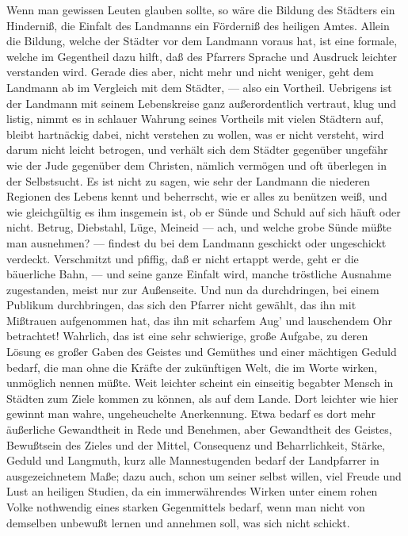 Wenn man gewissen Leuten glauben sollte, so wäre die Bildung des Städters ein Hinderniß, die Einfalt des Landmanns ein Förderniß des heiligen Amtes. Allein die Bildung, welche der Städter vor dem Landmann voraus hat, ist eine formale, welche im Gegentheil dazu hilft, daß des Pfarrers Sprache und Ausdruck leichter verstanden wird. Gerade dies aber, nicht mehr und nicht weniger, geht dem Landmann ab im Vergleich mit dem Städter, — also ein Vortheil. Uebrigens ist der Landmann mit seinem
Lebenskreise ganz außerordentlich vertraut, klug und listig, nimmt es in schlauer Wahrung seines Vortheils mit vielen Städtern auf, bleibt hartnäckig dabei, nicht verstehen zu wollen, was er nicht versteht, wird darum nicht leicht betrogen, und verhält sich dem Städter gegenüber ungefähr wie der Jude gegenüber dem Christen, nämlich vermögen und oft überlegen in der Selbstsucht. Es ist nicht zu sagen, wie sehr der Landmann die niederen Regionen des Lebens kennt und beherrscht, wie er alles zu benützen weiß, und wie gleichgültig es ihm insgemein ist, ob er Sünde und Schuld auf sich häuft oder nicht. Betrug, Diebstahl, Lüge, Meineid — ach, und welche grobe Sünde müßte man ausnehmen? — findest du bei dem Landmann geschickt oder ungeschickt verdeckt. Verschmitzt und pfiffig, daß er nicht ertappt werde, geht er die bäuerliche Bahn, — und seine ganze Einfalt wird, manche tröstliche Ausnahme zugestanden, meist nur zur Außenseite. Und nun da durchdringen, bei einem Publikum durchbringen, das sich den Pfarrer nicht gewählt, das ihn mit Mißtrauen aufgenommen hat, das ihn mit scharfem Aug’ und lauschendem Ohr betrachtet! Wahrlich, das ist eine sehr schwierige, große Aufgabe, zu deren Lösung es großer Gaben des Geistes und Gemüthes und einer mächtigen Geduld bedarf, die man ohne die Kräfte der zukünftigen Welt, die im Worte wirken, unmöglich nennen müßte. Weit leichter scheint ein einseitig begabter Mensch in Städten zum Ziele kommen zu können, als auf dem Lande. Dort leichter wie hier gewinnt man wahre, ungeheuchelte Anerkennung. Etwa bedarf es dort mehr äußerliche Gewandtheit in Rede und Benehmen,
aber Gewandtheit des Geistes, Bewußtsein des Zieles und der Mittel, Consequenz und Beharrlichkeit, Stärke, Geduld und Langmuth, kurz alle Mannestugenden bedarf der Landpfarrer in ausgezeichnetem Maße; dazu auch, schon um seiner selbst willen, viel Freude und Lust an heiligen Studien, da ein immerwährendes Wirken unter einem rohen Volke nothwendig eines starken Gegenmittels bedarf, wenn man nicht von demselben unbewußt lernen und annehmen soll, was sich nicht schickt.

